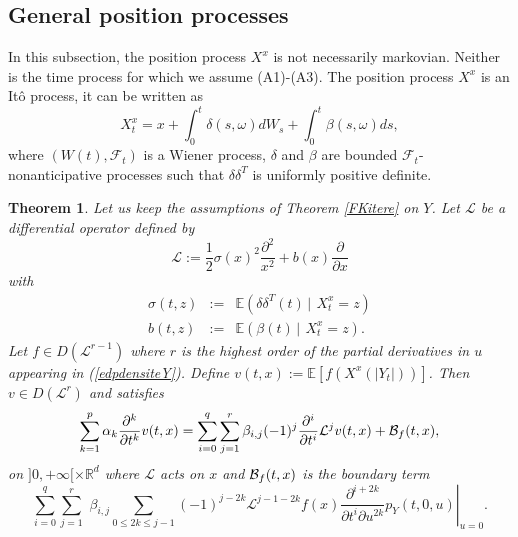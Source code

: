 \documentclass[a4paper, 11pt]{article}
\newtheorem{thm}{Theorem}%
\newcommand{\R}{\mathbb{R}}
\newcommand{\E}{\mathbb{E}}
\newcommand{\1}{\mathbf{1}}
\begin{document}
\subsection{General position processes}\label{gyongy}


In this subsection, the position process $X^x$ is not necessarily markovian. Neither is the time process for which we assume {\rm (A1)}-{\rm (A3)}. The position process $X^x$ is an It\^o process, it can be written as
\begin{equation}
X_t^x=x+\int_0^t \delta(s,\omega)dW_s+\int_0^t \beta(s,\omega)ds,
\end{equation}
where $(W(t),\mathcal{F}_t)$ is a Wiener process, $\delta$ and $\beta$ are bounded $\mathcal{F}_t$-nonanticipative processes such that $\delta\delta^T$ is uniformly positive definite. 



\begin{thm}
Let us keep the assumptions of Theorem \ref{FKitere} on $Y$. Let $\mathcal{L}$ be a differential operator defined by
$$\mathcal{L}:=\frac{1}{2}\sigma(x)^2\frac{\partial^2}{x^2}+b(x)\frac{\partial}{\partial x}$$
with
\begin{eqnarray}
\sigma(t,z)&:=&\E(\delta \delta^T(t)\, |\, \ X_t^x=z) \label{eq:95}\\
b(t,z)&:=&\E(\beta(t)\, |\, \ X_t^x=z). \label{eq:96}
\end{eqnarray}
Let $f\in D(\mathcal{L}^{r-1})$ where $r$ is the highest order of the partial derivatives in $u$ appearing in (\ref{edpdensiteY}).  Define $v(t,x):=\E \left[f(X^x(|Y_t|))\right]$. Then $v\in D(\mathcal{L}^{r})$ and satisfies
\begin{equation}
\label{edpFKitere2}
\sum_{k=1}^{p} \alpha_k \frac{\partial^k}{\partial t^k}v(t,x)=\sum_{i=0}^{q}\sum_{j=1}^{r}\beta_{i,j}(-1)^j\frac{\partial^i}{\partial t^i}\mathcal{L}^jv(t,x)+{\cal B}_f(t,x),
\end{equation}
on $]0,+\infty[\times \R^d$ where $\mathcal{L}$ acts on $x$ and  ${\cal B}_f(t,x)$ is the boundary term
\begin{equation}
\sum_{i=0}^{q}\sum_{j=1}^{r}\, \, \beta_{i,j}\sum_{0\leq 2k\leq j-1} (-1)^{j-2k}\mathcal{L}^{j-1-2k}f(x)\left. \frac{\partial^{i+2k}}{\partial t^i \partial u^{2k}}p_Y(t,0,u)\right|_{u=0}.
\end{equation}
\end{thm}
\end{document}
